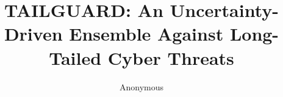 \documentclass[sigconf]{acmart}
\begin{document}
\title{TAILGUARD: An Uncertainty-Driven Ensemble
Against Long-Tailed Cyber Threats}

\author{Anonymous}








\end{document}
